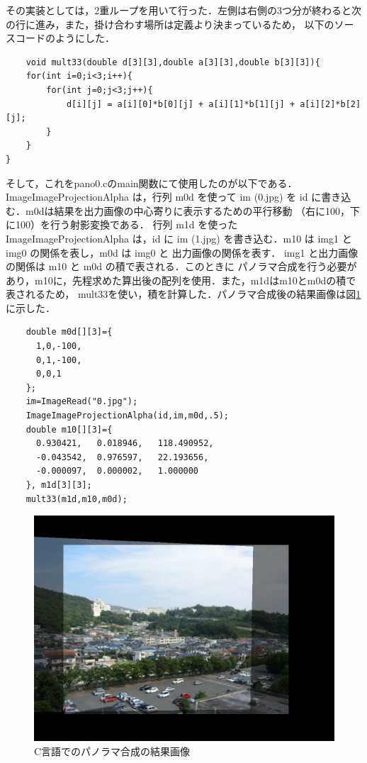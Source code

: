 \documentclass[11pt]{jarticle}
\begin{document}
その実装としては，2重ループを用いて行った．左側は右側の3つ分が終わると次の行に進み，また，掛け合わす場所は定義より決まっているため，
以下のソースコードのようにした．
\begin{verbatim}
    void mult33(double d[3][3],double a[3][3],double b[3][3]){
    for(int i=0;i<3;i++){
        for(int j=0;j<3;j++){
            d[i][j] = a[i][0]*b[0][j] + a[i][1]*b[1][j] + a[i][2]*b[2][j]; 
        }
    }
}
\end{verbatim}
そして，これをpano0.cのmain関数にて使用したのが以下である．
ImageImageProjectionAlpha は，行列 m0d を使って im (0.jpg) を id に書き込む．m0dは結果を出力画像の中心寄りに表示するための平行移動
（右に100，下に100）を行う射影変換である．
行列 m1d を使った ImageImageProjectionAlpha は，id に im (1.jpg) を書き込む．m10 は img1 と img0 の関係を表し，m0d は img0 と 出力画像の関係を表す．
img1 と出力画像の関係は m10 と m0d の積で表される．このときに
パノラマ合成を行う必要があり，m10に，先程求めた算出後の配列を使用．また，m1dはm10とm0dの積で表されるため，
mult33を使い，積を計算した．パノラマ合成後の結果画像は図\ref{2-7.png}に示した．

\begin{verbatim}
    double m0d[][3]={
      1,0,-100,
      0,1,-100,
      0,0,1
    };
    im=ImageRead("0.jpg");
    ImageImageProjectionAlpha(id,im,m0d,.5);
    double m10[][3]={
      0.930421,   0.018946,   118.490952,
      -0.043542,  0.976597,   22.193656,
      -0.000097,  0.000002,   1.000000 
    }, m1d[3][3];
    mult33(m1d,m10,m0d);
\end{verbatim}

\begin{figure}[h]
    \centering
    \includegraphics[scale=.3]{2-7.png}
    \caption{C言語でのパノラマ合成の結果画像}
    \label{2-7.png}
\end{figure}
\end{document}
